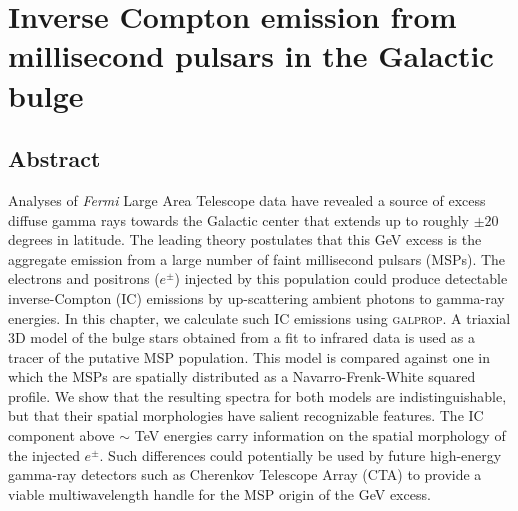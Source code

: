 \documentclass[doublespace,nopageskip]{VTthesis} %
\begin{document}



\chapter{Inverse Compton emission from millisecond pulsars in the Galactic bulge} \label{ch:IC_MSPs}

\section{Abstract}

Analyses of \textit{Fermi} Large Area Telescope data have revealed a source of excess diffuse gamma rays towards the Galactic center that extends up to roughly $\pm 20$ degrees in latitude. The leading theory postulates that this GeV excess is the aggregate emission from a large number of faint millisecond pulsars (MSPs). The electrons and positrons ($e^{\pm}$) injected by this population could produce detectable inverse-Compton (IC) emissions by up-scattering ambient photons to gamma-ray energies. In this chapter, we calculate such IC emissions using \textsc{galprop}. A triaxial 3D model of the bulge stars obtained from a fit to infrared data is used as a tracer of the putative MSP population. This model is compared against one in which the MSPs are spatially distributed as a Navarro-Frenk-White squared profile. We show that the resulting spectra for both models are indistinguishable, but that their spatial morphologies have salient recognizable features. The IC component above $\sim $ TeV energies carry information on the spatial morphology of the injected $e^\pm$. Such differences could potentially be used by future high-energy gamma-ray detectors such as Cherenkov Telescope Array (CTA) to provide a viable multiwavelength handle for the MSP origin of the GeV excess.
\end{document}
